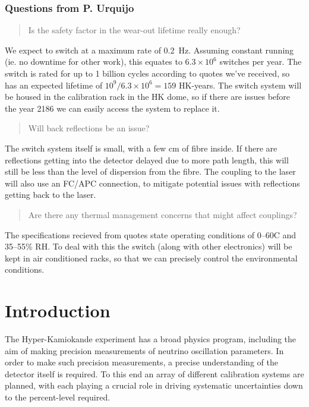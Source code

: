 \documentclass[a4paper,11pt]{article}
\begin{document}
\subsubsection{Questions from P. Urquijo}
\begin{quote}
    Is the safety factor in the wear-out lifetime really enough?
\end{quote}
We expect to switch at a maximum rate of 0.2~Hz. Assuming constant running (ie. no downtime for other work), this equates to $6.3\times10^6$ switches per year. The switch is rated for up to 1 billion cycles according to quotes we've received, so has an expected lifetime of $10^9/6.3\times10^6 = 159$ HK-years. The switch system will be housed in the calibration rack in the HK dome, so if there are issues before the year 2186 we can easily access the system to replace it.

\begin{quote}
    Will back reflections be an issue?
\end{quote}
The switch system itself is small, with a few cm of fibre inside. If there are reflections getting into the detector delayed due to more path length, this will still be less than the level of dispersion from the fibre. The coupling to the laser will also use an FC/APC connection, to mitigate potential issues with reflections getting back to the laser.

\begin{quote}
    Are there any thermal management concerns that might affect couplings?
\end{quote}
The specifications recieved from quotes state operating conditions of 0--60\degree C and 35--55\% RH. To deal with this the switch (along with other electronics) will be kept in air conditioned racks, so that we can precisely control the environmental conditions.

\clearpage
\newpage

\section{Introduction}\label{sec:intro}
The Hyper-Kamiokande experiment has a broad physics program, including the aim of making precision measurements of neutrino oscillation parameters. In order to make such precision measurements, a precise understanding of the detector itself is required. To this end an array of different calibration systems are planned, with each playing a crucial role in driving systematic uncertainties down to the percent-level required.
\end{document}
